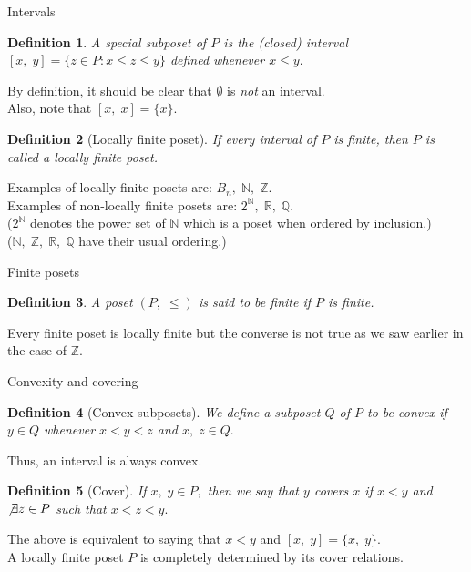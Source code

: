 \documentclass[handout, aspectratio=169]{beamer}
\newtheorem{defn}{Definition}
\begin{document}
\begin{frame}{Intervals}
	\begin{defn}
		A special subposet of $P$ is the (closed) interval $[x,\;y] = \{z \in P : x \le z \le y\}$ defined whenever $x \le y.$
	\end{defn}
	By definition, it should be clear that $\emptyset$ is \emph{not} an interval.\\
	Also, note that $[x,\;x] = \{x\}.$
	\begin{defn}[Locally finite poset]
		If every interval of $P$ is finite, then $P$ is called a locally finite poset.
	\end{defn}
	Examples of locally finite posets are: $B_n,\; \mathbb{N},\; \mathbb{Z}.$\\
	Examples of non-locally finite posets are: $2^\mathbb{N},\;\mathbb{R},\;\mathbb{Q}.$\\
	($2^\mathbb{N}$ denotes the power set of $\mathbb{N}$ which is a poset when ordered by inclusion.)\\
	($\mathbb{N},\;\mathbb{Z},\;\mathbb{R},\;\mathbb{Q}$ have their usual ordering.)
\end{frame}
\begin{frame}{Finite posets}
	\begin{defn}
		A poset $(P,\;\le)$ is said to be finite if $P$ is finite.
	\end{defn}
	Every finite poset is locally finite but the converse is not true as we saw earlier in the case of $\mathbb{Z}.$
\end{frame}
\begin{frame}{Convexity and covering}
	\begin{defn}[Convex subposets]
		We define a subposet $Q$ of $P$ to be convex if $y \in Q$ whenever $x < y < z$ and $x, \; z \in Q.$
	\end{defn}
	Thus, an interval is always convex.
	\begin{defn}[Cover]
		If $x,\; y\in P,$ then we say that $y$ covers $x$ if $x < y$ and $\not\exists z \in P$ such that $x < z < y.$
	\end{defn}
	The above is equivalent to saying that $x < y$ and $[x,\;y] = \{x,\;y\}.$\\
	A locally finite poset $P$ is completely determined by its cover relations.
\end{frame}
\end{document}
